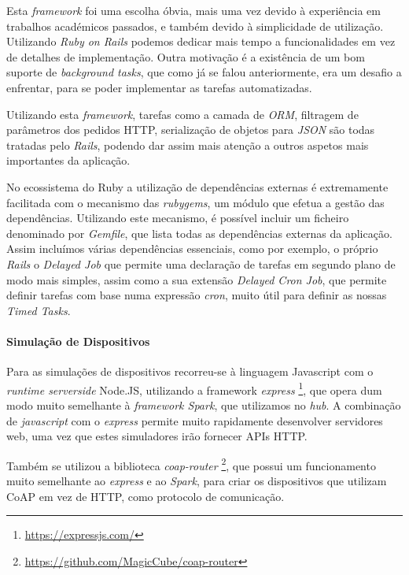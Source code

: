 Esta \textit{framework} foi uma escolha óbvia, mais uma vez devido à experiência em trabalhos académicos passados, e também devido à simplicidade de utilização. Utilizando \textit{Ruby on Rails} podemos dedicar mais tempo a funcionalidades em vez de detalhes de implementação. Outra motivação é a existência de um bom suporte de \textit{background tasks}, que como já se falou anteriormente, era um desafio a enfrentar, para se poder implementar as tarefas automatizadas.

Utilizando esta \textit{framework}, tarefas como a camada de \textit{ORM}, filtragem de parâmetros dos pedidos HTTP, serialização de objetos para \textit{JSON} são todas tratadas pelo \textit{Rails}, podendo dar assim mais atenção a outros aspetos mais importantes da aplicação.

No ecossistema do Ruby a utilização de dependências externas é extremamente facilitada com o mecanismo das \textit{rubygems}, um módulo que efetua a gestão das dependências. Utilizando este mecanismo, é possível incluir um ficheiro denominado por \textit{Gemfile}, que lista todas as dependências externas da aplicação. Assim incluímos várias dependências essenciais, como por exemplo, o próprio \textit{Rails} o \textit{Delayed Job} que permite uma declaração de tarefas em segundo plano de modo mais simples, assim como a sua extensão \textit{Delayed Cron Job}, que permite definir tarefas com base numa expressão \textit{cron}, muito útil para definir as nossas \textit{Timed Tasks}.

\paragraph*{Simulação de Dispositivos}

Para as simulações de dispositivos recorreu-se à linguagem Javascript com o \textit{runtime serverside} Node.JS, utilizando a framework \textit{express} \footnote{\url{https://expressjs.com/}}, que opera dum modo muito semelhante à \textit{framework Spark}, que utilizamos no \textit{hub}. A combinação de \textit{javascript} com o \textit{express} permite muito rapidamente desenvolver servidores web, uma vez que estes simuladores irão fornecer APIs HTTP.

Também se utilizou a biblioteca \textit{coap-router} \footnote{\url{https://github.com/MagicCube/coap-router}}, que possui um funcionamento muito semelhante ao \textit{express} e ao \textit{Spark}, para criar os dispositivos que utilizam CoAP em vez de HTTP, como protocolo de comunicação.

